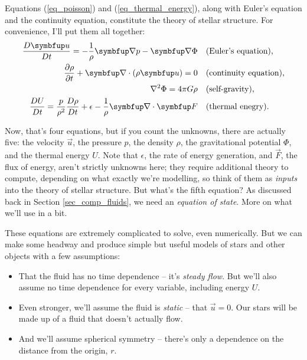 Equations (\ref{eq_poisson}) and (\ref{eq_thermal_energy}), along with Euler's equation and the continuity equation, constitute the theory of stellar structure.  For convenience, I'll put them all together:
\begin{align*}
\frac{D \uu}{Dt} = -\frac{1}{\rho} \grad p - \grad \Phi & \quad \text{(Euler's equation),} \\
\frac{\partial \rho}{\partial t} + \vec{\nabla} \cdot (\rho \vec{u} ) = 0 & \quad \text{(continuity equation),} \\
\nabla^2 \Phi = 4 \pi G \rho & \quad \text{(self-gravity),} \\
\frac{DU}{Dt} = \frac{p}{\rho^2} \frac{D\rho}{Dt} + \epsilon - \frac{1}{\rho}  \grad \cdot \vec{F} & \quad \text{(thermal enegry).}
\end{align*}

Now, that's four equations, but if you count the unknowns, there are actually five:  the velocity $\vec{u}$, the pressure $p$, the density $\rho$, the gravitational potential $\Phi$, and the thermal energy $U$.  Note that $\epsilon$, the rate of energy generation, and $\vec{F}$, the flux of energy, aren't strictly unknowns here; they require additional theory to compute, depending on what exactly we're modelling, so think of them as \emph{inputs} into the theory of stellar structure. But what's the fifth equation?  As discussed back in Section \ref{sec_comp_fluids}, we need an \emph{equation of state}.  More on what we'll use in a bit.

These equations are extremely complicated to solve, even numerically.  But we can make some headway and produce simple but useful models of stars and other objects with a few assumptions:
\begin{itemize}
\item That the fluid has no time dependence -- it's \emph{steady flow}.  But we'll also assume no time dependence for every variable, including energy $U$.
\item Even stronger, we'll assume the fluid is \emph{static} -- that $\vec{u} = 0$.  Our stars will be made up of a fluid that doesn't actually flow.
\item And we'll assume spherical symmetry -- there's only a dependence on the distance from the origin, $r$.
\end{itemize}

